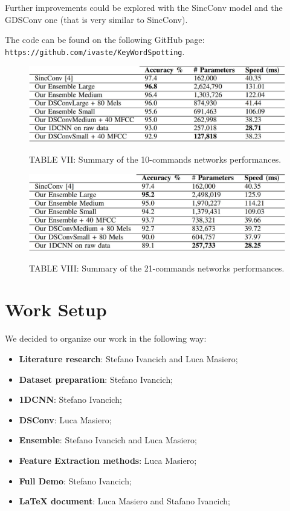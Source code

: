 \documentclass[conference]{IEEEtran}
\begin{document}
Further improvements could be explored with the SincConv model and the GDSConv one (that is very similar to SincConv).

The code can be found on the following GitHub page: \texttt{https://github.com/ivaste/KeyWordSpotting}.

\begin{figure}
\centering
\includegraphics[scale=0.3]{tab1}
\begin{center}
TABLE VII: Summary of the 10-commands networks performances.
\end{center}
\end{figure}

\begin{figure}
\centering
\includegraphics[scale=0.3]{tab2}
\begin{center}
TABLE VIII: Summary of the 21-commands networks performances.
\end{center}
\end{figure}

\newpage
\section*{Work Setup}
We decided to organize our work in the following way:
\begin{itemize}
\item \textbf{Literature research}: Stefano Ivancich and Luca Masiero;
\item \textbf{Dataset preparation}: Stefano Ivancich;
\item \textbf{1DCNN}: Stefano Ivancich;
\item \textbf{DSConv}: Luca Masiero;
\item \textbf{Ensemble}: Stefano Ivancich and Luca Masiero;
\item \textbf{Feature Extraction methods}: Luca Masiero;
\item \textbf{Full Demo}: Stefano Ivancich;
\item \textbf{\LaTeX\xspace document}: Luca Masiero and Stafano Ivancich;
\end{itemize}
\end{document}
